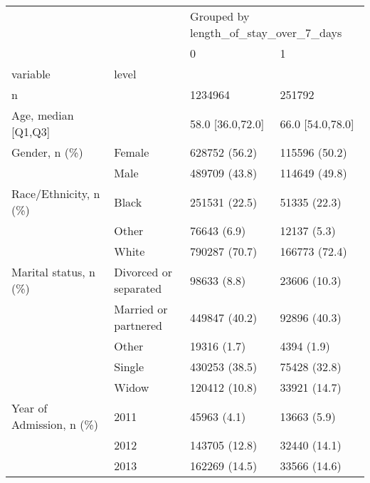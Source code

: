 \begin{tabular}{llll}
\toprule
                                       &   & \multicolumn{2}{l}{Grouped by length\_of\_stay\_over\_7\_days} \\
                                       &   &                                     0 &                 1 \\
variable & level &                                       &                   \\
\midrule
n &   &                               1234964 &            251792 \\
Age, median [Q1,Q3] &   &                      58.0 [36.0,72.0] &  66.0 [54.0,78.0] \\
Gender, n (\%) & Female &                         628752 (56.2) &     115596 (50.2) \\
                                       & Male &                         489709 (43.8) &     114649 (49.8) \\
Race/Ethnicity, n (\%) & Black &                         251531 (22.5) &      51335 (22.3) \\
                                       & Other &                           76643 (6.9) &       12137 (5.3) \\
                                       & White &                         790287 (70.7) &     166773 (72.4) \\
Marital status, n (\%) & Divorced or separated &                           98633 (8.8) &      23606 (10.3) \\
                                       & Married or partnered &                         449847 (40.2) &      92896 (40.3) \\
                                       & Other &                           19316 (1.7) &        4394 (1.9) \\
                                       & Single &                         430253 (38.5) &      75428 (32.8) \\
                                       & Widow &                         120412 (10.8) &      33921 (14.7) \\
Year of Admission, n (\%) & 2011 &                           45963 (4.1) &       13663 (5.9) \\
                                       & 2012 &                         143705 (12.8) &      32440 (14.1) \\
                                       & 2013 &                         162269 (14.5) &      33566 (14.6) \\

\end{tabular}
